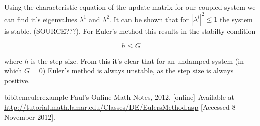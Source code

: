 \documentclass[a4paper,11pt,twoside]{article}
\begin{document}
Using the characteristic equation of the update matrix for our coupled 
system we can find it's eigenvalues \(\lambda^{1}\) and \(\lambda^{2}\). 
It can be shown that for \(|\lambda^{i}|^{2} \leq 1\) the system is stable.
(SOURCE???). For Euler's method this results in the stabilty condition

\begin{equation}
	\label{eq:stab}
	h \leq G
\end{equation}

where \(h\) is the step size.
From this it's clear that for an undamped system (in which \(G=0\))
Euler's method is always unstable, as the step size is always positive.

\begin{thebibliography}{20}

bibitem{eulerexample}
Paul's Online Math Notes, 2012. [online] Available at \url{http://tutorial.math.lamar.edu/Classes/DE/EulersMethod.asp}
[Accessed 8 November 2012].

\end{thebibliography}
\end{document}
